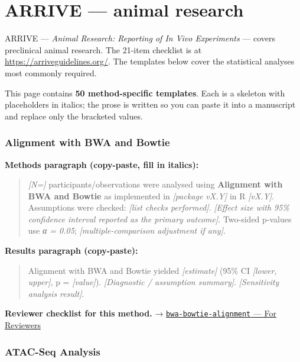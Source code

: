 \documentclass[
]{article}
\author{}
\date{\vspace{-2.5em}}
\begin{document}
\section{ARRIVE --- animal research}\label{arrive-animal-research}

ARRIVE --- \emph{Animal Research: Reporting of In Vivo Experiments} ---
covers preclinical animal research. The 21-item checklist is at
\url{https://arriveguidelines.org/}. The templates below cover the
statistical analyses most commonly required.

This page contains \textbf{50 method-specific templates}. Each is a
skeleton with placeholders in italics; the prose is written so you can
paste it into a manuscript and replace only the bracketed values.

\subsubsection{Alignment with BWA and
Bowtie}\label{alignment-with-bwa-and-bowtie}

\textbf{Methods paragraph (copy-paste, fill in italics):}

\begin{quote}
\emph{{[}N={]}} participants/observations were analysed using
\textbf{Alignment with BWA and Bowtie} as implemented in
\emph{{[}package vX.Y{]}} in R \emph{{[}vX.Y{]}}. Assumptions were
checked: \emph{{[}list checks performed{]}}. \emph{{[}Effect size with
95\% confidence interval reported as the primary outcome{]}}. Two-sided
p-values use \emph{α = 0.05}; \emph{{[}multiple-comparison adjustment if
any{]}}.
\end{quote}

\textbf{Results paragraph (copy-paste):}

\begin{quote}
Alignment with BWA and Bowtie yielded \emph{{[}estimate{]}} (95\% CI
\emph{{[}lower, upper{]}}, p = \emph{{[}value{]}}). \emph{{[}Diagnostic
/ assumption summary{]}}. \emph{{[}Sensitivity analysis result{]}}.
\end{quote}

\textbf{Reviewer checklist for this method.} →
\href{../chapters/12-bioinformatics/bwa-bowtie-alignment.Rmd\#for-reviewers}{\texttt{bwa-bowtie-alignment}
--- For Reviewers}

\subsubsection{ATAC-Seq Analysis}\label{atac-seq-analysis}
\end{document}
